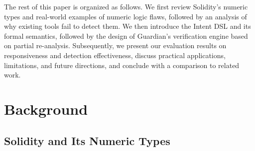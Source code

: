 \documentclass[10pt, conference]{IEEEtran}
\begin{document}
The rest of this paper is organized as follows.  
We first review Solidity's numeric types and real-world examples of numeric logic flaws, followed by an analysis of why existing tools fail to detect them.  
We then introduce the Intent DSL and its formal semantics, followed by the design of Guardian's verification engine based on partial re-analysis.  
Subsequently, we present our evaluation results on responsiveness and detection effectiveness, discuss practical applications, limitations, and future directions, and conclude with a comparison to related work.


\section{Background}

\begin{table}[!t]
        \centering
        \caption{Distribution of Variable Types in Smart Contract Functions}
        \label{tab:variable_distribution}
    \end{table}

\subsection{Solidity and Its Numeric Types}
\end{document}
